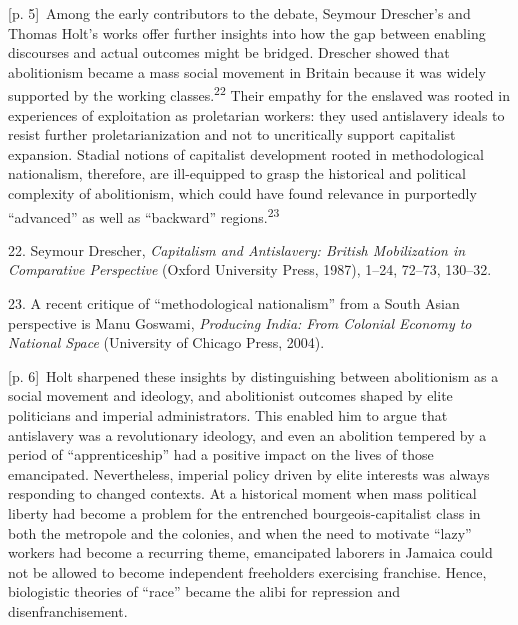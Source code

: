 \documentclass[10pt,a4paper]{article}
\begin{document}
{\scriptsize\color{gray} [p. 5]}\ Among the early contributors to the debate, Seymour Drescher’s and Thomas Holt’s works offer further insights into how the gap between enabling discourses and actual outcomes might be bridged. Drescher showed that abolitionism became a mass social movement in Britain because it was widely supported by the working classes.\nobreak\textsuperscript{22} Their empathy for the enslaved was rooted in experiences of exploitation as proletarian workers: they used antislavery ideals to resist further proletarianization and not to uncritically support capitalist expansion. Stadial notions of capitalist development rooted in methodological nationalism, therefore, are ill-equipped to grasp the historical and political complexity of abolitionism, which could have found relevance in purportedly “advanced” as well as “backward” regions.\nobreak\textsuperscript{23}\par{\small 22. Seymour Drescher, \textit{Capitalism and Antislavery: British Mobilization in Comparative Perspective} (Oxford University Press, 1987), 1–24, 72–73, 130–32.\par}{\small 23. A recent critique of “methodological nationalism” from a South Asian perspective is Manu Goswami, \textit{Producing India: From Colonial Economy to National Space} (University of Chicago Press, 2004).\par}
{\scriptsize\color{gray} [p. 6]}\ Holt sharpened these insights by distinguishing between abolitionism as a social movement and ideology, and abolitionist outcomes shaped by elite politicians and imperial administrators. This enabled him to argue that antislavery was a revolutionary ideology, and even an abolition tempered by a period of “apprenticeship” had a positive impact on the lives of those emancipated. Nevertheless, imperial policy driven by elite interests was always responding to changed contexts. At a historical moment when mass political liberty had become a problem for the entrenched bourgeois-capitalist class in both the metropole and the colonies, and when the need to motivate “lazy” workers had become a recurring theme, emancipated laborers in Jamaica could not be allowed to become independent freeholders exercising franchise. Hence, biologistic theories of “race” became the alibi for repression and disenfranchisement.\par
\end{document}
